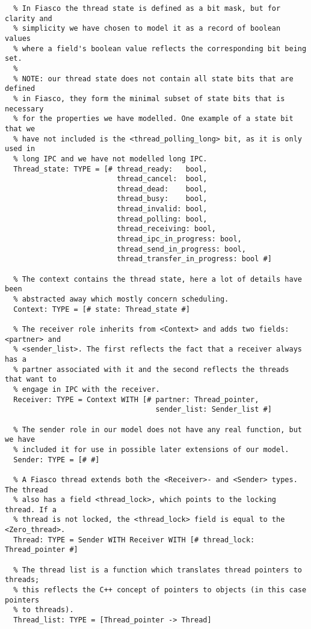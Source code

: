 \begin{lstlisting}
  % In Fiasco the thread state is defined as a bit mask, but for clarity and 
  % simplicity we have chosen to model it as a record of boolean values 
  % where a field's boolean value reflects the corresponding bit being set.
  %
  % NOTE: our thread state does not contain all state bits that are defined
  % in Fiasco, they form the minimal subset of state bits that is necessary
  % for the properties we have modelled. One example of a state bit that we
  % have not included is the <thread_polling_long> bit, as it is only used in
  % long IPC and we have not modelled long IPC.
  Thread_state: TYPE = [# thread_ready:   bool,
                          thread_cancel:  bool,
                          thread_dead:    bool,
                          thread_busy:    bool,
                          thread_invalid: bool,
                          thread_polling: bool,
                          thread_receiving: bool,
                          thread_ipc_in_progress: bool,
                          thread_send_in_progress: bool,
                          thread_transfer_in_progress: bool #]

  % The context contains the thread state, here a lot of details have been
  % abstracted away which mostly concern scheduling.
  Context: TYPE = [# state: Thread_state #]

  % The receiver role inherits from <Context> and adds two fields: <partner> and
  % <sender_list>. The first reflects the fact that a receiver always has a 
  % partner associated with it and the second reflects the threads that want to
  % engage in IPC with the receiver.
  Receiver: TYPE = Context WITH [# partner: Thread_pointer, 
                                   sender_list: Sender_list #]

  % The sender role in our model does not have any real function, but we have
  % included it for use in possible later extensions of our model.
  Sender: TYPE = [# #]

  % A Fiasco thread extends both the <Receiver>- and <Sender> types. The thread
  % also has a field <thread_lock>, which points to the locking thread. If a
  % thread is not locked, the <thread_lock> field is equal to the <Zero_thread>. 
  Thread: TYPE = Sender WITH Receiver WITH [# thread_lock: Thread_pointer #]

  % The thread list is a function which translates thread pointers to threads;
  % this reflects the C++ concept of pointers to objects (in this case pointers
  % to threads).
  Thread_list: TYPE = [Thread_pointer -> Thread]


\end{lstlisting}
